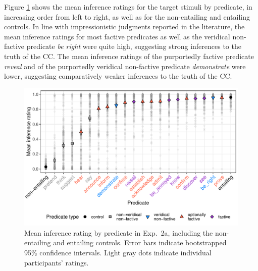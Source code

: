\documentclass[11pt,fleqn]{article}
\newcommand{\6}{\mbox{$[\hspace*{-.6mm}[$}}
\newcommand{\9}{\mbox{$]\hspace*{-.6mm}]$}}
\begin{document}
Figure \ref{f-veridicality-predicate} shows the mean inference ratings for the target stimuli by predicate, in increasing order from left to right, as well as for the non-entailing and entailing controls. In line with impressionistic judgments reported in the literature, the mean inference ratings for most factive predicates as well as the veridical non-factive predicate {\em be right} were quite high, suggesting strong inferences to the truth of the CC. The mean inference ratings of the purportedly factive predicate {\em reveal} and of the purportedly veridical non-factive predicate {\em demonstrate} were lower, suggesting comparatively weaker inferences to the truth of the CC. 

\begin{figure}[h!]
\centering

\includegraphics[width=.7\paperwidth]{../../results/4-veridicality3/graphs/means-inference-by-predicate-variability}

\caption{Mean inference rating by predicate in Exp.~2a, including the non-entailing and entailing controls. Error bars indicate bootstrapped 95\% confidence intervals. Light gray dots indicate individual participants' ratings.} 
\label{f-veridicality-predicate}
\end{figure}
\end{document}
